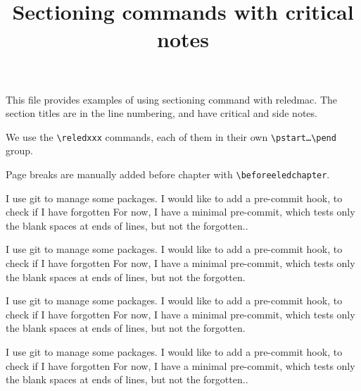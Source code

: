 \documentclass[twoside,12pt]{book}
\begin{document}
\title{Sectioning commands with critical notes}

\date{}

{\let\newpage\relax\maketitle}
{\small
This file provides examples of using sectioning command with reledmac. The section titles are in the line numbering, and have critical and side notes. 

We use the \verb+\reledxxx+ commands, each of them in their own \verb+\pstart…\pend+ group. 

Page breaks are manually added before chapter with \verb+\beforeeledchapter+.
}
\beginnumbering
\beforeeledchapter
\pstart
{}
\pend

\pstart
I use git to manage some packages.
I would like to add a pre-commit hook, to check if I have forgotten
For now, I have a minimal pre-commit, which tests only the blank spaces at ends of lines, but not the forgotten..
\pend

\pstart
{}
\pend

\pstart
{}
\pend

\pstart
{}
\pend

\pstart
I use git to manage some packages.
I would like to add a pre-commit hook, to check if I have forgotten
For now, I have a minimal pre-commit, which tests only the blank spaces at ends of lines, but not the forgotten.
\pend

\pstart
{}
\pend

\pstart
I use git to manage some packages.
I would like to add a pre-commit hook, to check if I have forgotten
For now, I have a minimal pre-commit, which tests only the blank spaces at ends of lines, but not the forgotten.
\pend


\beforeeledchapter
\pstart
{}
\pend

\pstart
I use git to manage some packages.
I would like to add a pre-commit hook, to check if I have forgotten
For now, I have a minimal pre-commit, which tests only the blank spaces at ends of lines, but not the forgotten..
\pend
\end{document}
